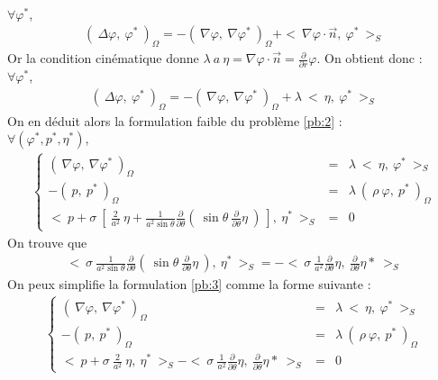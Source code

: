\documentclass[a4paper]{report}
\begin{document}
\\[0.25cm]
$\forall \varphi^*$,
\begin{eqnarray*}
(\ \Delta \varphi ,\ \varphi^* \ )_\Omega = - (\ \nabla \varphi ,\ \nabla \varphi^* \ )_\Omega + <\ \nabla \varphi \cdot \vec{n},\ \varphi^* \ >_S
\end{eqnarray*}
Or la condition cinématique donne $\lambda\ a\ \eta = \nabla \varphi \cdot \vec{n} = \frac{\partial}{\partial r} \varphi$. On obtient donc :
\\[0.25cm]
$\forall \varphi^*$,
\begin{eqnarray*}
(\ \Delta \varphi ,\ \varphi^* \ )_\Omega = - (\ \nabla \varphi ,\ \nabla \varphi^* \ )_\Omega + \lambda\ <\ \eta,\ \varphi^* \ >_S
\end{eqnarray*}
On en déduit alors la formulation faible du problème \eqref{pb:2} :
\\[0.25cm]
$\forall (\varphi^*, p^*, \eta^*)$,
\begin{eqnarray}\label{pb:3}
\left\{
\begin{array}{rcl}
(\ \nabla \varphi ,\ \nabla \varphi^* \ )_\Omega &=& \lambda\ <\ \eta,\ \varphi^* \ >_S \\
- (\ p ,\ p^* \ )_\Omega &=& \lambda\ (\ \rho\ \varphi ,\ p^* \ )_\Omega \\
<\ p + \sigma\ \left[\ \frac{2}{a^2} \ \eta
                       + \frac{1}{a^2 \sin\theta} \frac{\partial}{\partial \theta}(\ \sin\theta \ \frac{\partial}{\partial \theta} \eta \ )\ \right] ,\ \eta^* \ >_S &=& 0
\end{array}
\right.
\end{eqnarray}
On trouve que
\begin{eqnarray*}
<\ \sigma\ \frac{1}{a^2 \sin\theta} \frac{\partial}{\partial \theta}(\ \sin\theta \ \frac{\partial}{\partial \theta} \eta \ ) ,\ \eta^* \ >_S
=
- <\ \sigma\ \frac{1}{a^2} \frac{\partial}{\partial \theta} \eta ,\ \frac{\partial}{\partial \theta} \eta* \ >_S
\end{eqnarray*}
On peux simplifie la formulation \eqref{pb:3} comme la forme suivante :
\begin{eqnarray}\label{pb:4}
\left\{
\begin{array}{rcl}
(\ \nabla \varphi ,\ \nabla \varphi^* \ )_\Omega &=& \lambda\ <\ \eta,\ \varphi^* \ >_S \\
- (\ p ,\ p^* \ )_\Omega &=& \lambda\ (\ \rho\ \varphi ,\ p^* \ )_\Omega \\
<\ p + \sigma\ \frac{2}{a^2} \ \eta ,\ \eta^* \ >_S - <\ \sigma\ \frac{1}{a^2} \frac{\partial}{\partial \theta} \eta ,\ \frac{\partial}{\partial \theta} \eta* \ >_S &=& 0
\end{array}
\right.
\end{eqnarray}
\end{document}
